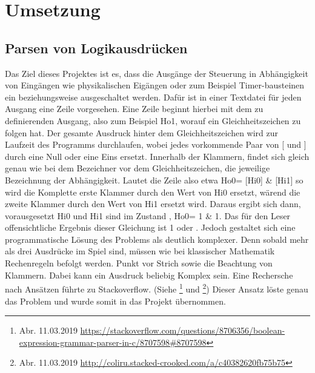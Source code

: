\section{Umsetzung}\label{kap:ums}


\subsection{Parsen von Logikausdrücken}\label{kap:ums:parsing}
Das Ziel dieses Projektes ist es, dass die Ausgänge der Steuerung in Abhängigkeit von Eingängen wie physikalischen Eigängen oder zum Beispiel Timer-bausteinen ein beziehungsweise ausgeschaltet werden. Dafür ist in einer Textdatei für jeden Ausgang eine Zeile vorgesehen. Eine Zeile beginnt hierbei mit dem zu definierenden Ausgang, also zum Beispiel Ho1, worauf ein Gleichheitszeichen zu folgen hat. Der gesamte Ausdruck hinter dem Gleichheitszeichen wird zur Laufzeit des Programms durchlaufen, wobei jedes vorkommende Paar von [ und ] durch eine Null oder eine Eins ersetzt. Innerhalb der Klammern, findet sich gleich genau wie bei dem Bezeichner vor dem Gleichheitszeichen, die jeweilige Bezeichnung der Abhängigkeit. Lautet die Zeile also etwa Ho0= [Hi0] \& [Hi1] so wird die Komplette erste Klammer durch den Wert von Hi0 ersetzt, wärend die zweite Klammer  durch den Wert von Hi1 ersetzt wird. Daraus ergibt sich dann, vorausgesetzt Hi0 und Hi1 sind im Zustand , Ho0= 1 \& 1. Das für den Leser offensichtliche Ergebnis dieser Gleichung ist 1 oder . Jedoch gestaltet sich eine programmatische Lösung des Problems als deutlich komplexer. Denn sobald mehr als drei Ausdrücke im Spiel sind, müssen wie bei klassischer Mathematik Rechenregeln befolgt werden. Punkt vor Strich sowie die Beachtung von Klammern. Dabei kann ein Ausdruck beliebig Komplex sein. Eine Rechersche nach Ansätzen führte zu Stackoverflow. (Siehe  
\footnote{Abr. 11.03.2019 \url{https://stackoverflow.com/questions/8706356/boolean-expression-grammar-parser-in-c/8707598\#8707598}}
 und  \footnote{Abr. 11.03.2019 \url{http://coliru.stacked-crooked.com/a/c40382620fb75b75}}) Dieser Ansatz löste genau das Problem und wurde somit in das Projekt übernommen. 
%
